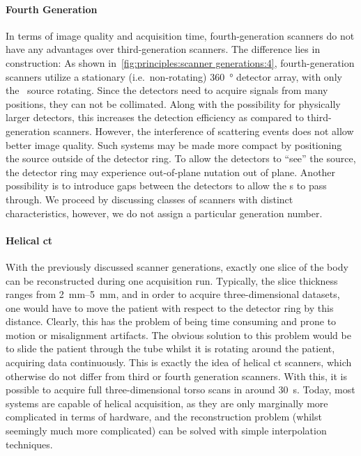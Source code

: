 \documentclass[../ml-tct.tex]{subfiles}
\begin{document}
\paragraph{Fourth Generation} In terms of image quality and acquisition time, fourth-generation scanners do not have any advantages over third-generation scanners.
The difference lies in construction:
As shown in~\cref{fig:principles:scanner generations:4}, fourth-generation scanners utilize a stationary (i.e.\ non-rotating) \SI{360}{\degree} detector array, with only the \xray\ source rotating.
Since the detectors need to acquire signals from many positions, they can not be collimated.
Along with the possibility for physically larger detectors, this increases the detection efficiency as compared to third-generation scanners.
However, the interference of scattering events does not allow better image quality.
Such systems may be made more compact by positioning the source outside of the detector ring.
To allow the detectors to \enquote{see} the source, the detector ring may experience out-of-plane nutation out of plane.
Another possibility is to introduce gaps between the detectors to allow the \xray{}s to pass through.
We proceed by discussing classes of scanners with distinct characteristics, however, we do not assign a particular generation number.
\paragraph{Helical \gls{ct}} With the previously discussed scanner generations, exactly one slice of the body can be reconstructed during one acquisition run.
Typically, the slice thickness ranges from \SIrange{2}{5}{\milli\meter}, and in order to acquire three-dimensional datasets, one would have to move the patient with respect to the detector ring by this distance.
Clearly, this has the problem of being time consuming and prone to motion or misalignment artifacts.
The obvious solution to this problem would be to slide the patient through the tube whilst it is rotating around the patient, acquiring data continuously.
This is exactly the idea of helical \gls{ct} scanners, which otherwise do not differ from third or fourth generation scanners.
With this, it is possible to acquire full three-dimensional torso scans in around \SI{30}{\second}.
Today, most systems are capable of helical acquisition, as they are only marginally more complicated in terms of hardware, and the reconstruction problem (whilst seemingly much more complicated) can be solved with simple interpolation techniques.
\end{document}
